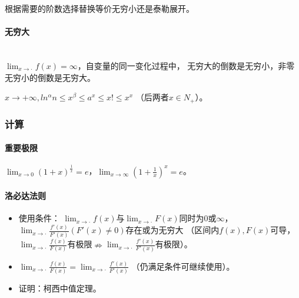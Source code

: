 \documentclass[
12pt, %
a4paper, 
oneside, %
headinclude,footinclude, %
]{scrartcl}
\begin{document}
根据需要的阶数选择替换等价无穷小还是泰勒展开。
\paragraph{无穷大}~\\

$ \lim_{x \to \cdot} f(x) = \infty $，自变量的同一变化过程中，
无穷大的倒数是无穷小，非零无穷小的倒数是无穷大。

$ x \rightarrow + \infty, ln^\alpha n \leq x^\beta \leq a^x \leq x! \leq x^x $
（后两者$ x \in N_+ $）。
\subsubsection{计算}
\paragraph{重要极限}
$ \lim_{x \to 0} (1 + x)^{\frac{1}{x}} = e $，$ \lim_{x \to \infty} (1 + \frac{1}{x})^{x} = e $。
\paragraph{洛必达法则}
\begin{itemize}
\item 使用条件：
$ \lim_{x \to \cdot} f(x) $与$ \lim_{x \to \cdot} F(x) $同时为$ 0 $或$ \infty $，
$ \lim_{x \to \cdot} \frac{f'(x)}{F'(x)}(F'(x) \neq 0) $存在或为无穷大
（区间内$ f(x), F(x) $可导，$ \lim_{x \to \cdot} \frac{f(x)}{F(x)} $有极限$ \nRightarrow $$ \lim_{x \to \cdot} \frac{f'(x)}{F'(x)} $有极限）。
\item $ \lim_{x \to \cdot} \frac{f(x)}{F(x)} = \lim_{x \to \cdot} \frac{f'(x)}{F'(x)} $
（仍满足条件可继续使用）。
\item 证明：柯西中值定理。
\end{itemize}
\end{document}
